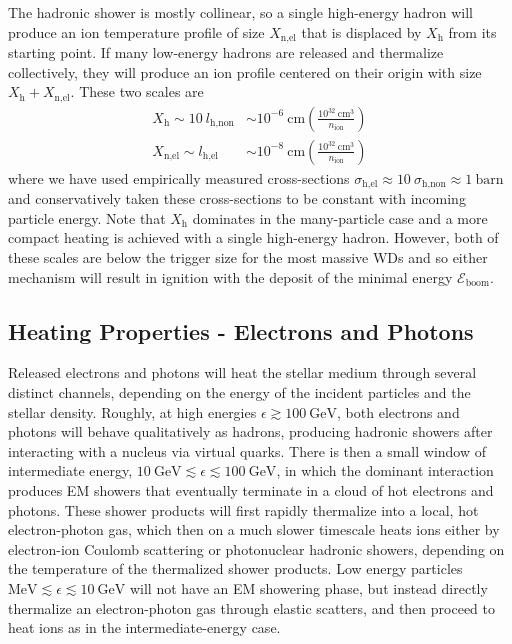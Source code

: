 \documentclass[twocolumn,showpacs,preprintnumbers,amsmath,amssymb,prd]{revtex4}
\newcommand{\Eboom}{\mathcal{E}_\text{boom}}
\newcommand{\GeV}{\text{GeV}}
\newcommand{\MeV}{\text{MeV}}
\def\r{\right)}
\def\l{\left(}
\begin{document}
The hadronic shower is mostly collinear, so a single high-energy hadron will produce an ion temperature profile of size $X_\text{n,el}$ that is displaced by $X_\text{h}$ from its starting point. 
If many low-energy hadrons are released and thermalize collectively, they will produce an ion profile centered on their origin with size $X_\text{h} + X_\text{n,el}$.
These two scales are
\begin{align}
  X_\text{h} \sim 10 ~l_\text{h,non}
  &\sim 10^{-6} ~\text{cm} \l\frac{10^{32}~\text{cm}^3}{n_\text{ion}}\r \\ 
  X_\text{n,el} \sim l_\text{h,el}  
  &\sim  10^{-8} ~\text{cm} \l\frac{10^{32}~\text{cm}^3}{n_\text{ion}}\r
\end{align}
where we have used empirically measured cross-sections $\sigma_\text{h,el} \approx 10~\sigma_\text{h,non} \approx 1~\text{barn}$ and conservatively taken these cross-sections to be constant with incoming particle energy.
Note that $X_\text{h}$ dominates in the many-particle case and a more compact heating is achieved with a single high-energy hadron. 
However, both of these scales are below the trigger size for the most massive WDs and so either mechanism will result in ignition with the deposit of the minimal energy $\Eboom$. 

\subsection{Heating Properties - Electrons and Photons}

Released electrons and photons will heat the stellar medium through several distinct channels, depending on the energy of the incident particles and the stellar density.  
Roughly, at high energies $\epsilon \gtrsim 100~\GeV$, both electrons and photons will behave qualitatively as hadrons, producing hadronic showers after interacting with a nucleus via virtual quarks. 
There is then a small window of intermediate energy, $10~\GeV \lesssim \epsilon \lesssim 100~\GeV$, in which the dominant interaction produces EM showers that eventually terminate in a cloud of hot electrons and photons. 
These shower products will first rapidly thermalize into a local, hot electron-photon gas, which then on a much slower timescale heats ions either by electron-ion Coulomb scattering or photonuclear hadronic showers, depending on the temperature of the thermalized shower products. 
Low energy particles $\MeV \lesssim \epsilon \lesssim 10~\GeV$ will not have an EM showering phase, but instead directly thermalize an electron-photon gas through elastic scatters, and then proceed to heat ions as in the intermediate-energy case.  
\end{document}
